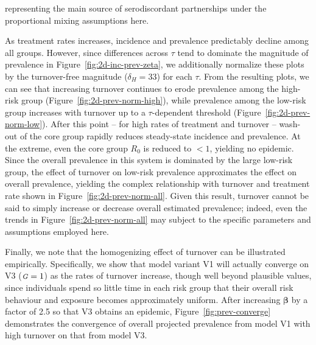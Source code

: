 \documentclass[10pt]{article}
\numberwithin{equation}{section}
\newcommand{\G}{{\mbox{\footnotesize{\textit{G}}}}}
\newcommand{\fig}[1]{Figure~\ref{#1}}
\begin{document}
representing the main source of serodiscordant partnerships
under the proportional mixing assumptions here.
\par
As treatment rates increases,
incidence and prevalence predictably decline among all groups.
However, since differences across $\tau$ tend to dominate
the magnitude of prevalence in \fig{fig:2d-inc-prev-zeta},
we additionally normalize these plots
by the turnover-free magnitude ($\delta_H = 33$) for each $\tau$.
From the resulting plots, we can see that
increasing turnover continues to erode prevalence among the high-risk group
(\fig{fig:2d-prev-norm-high}),
while prevalence among the low-risk group increases with turnover
up to a $\tau$-dependent threshold
(\fig{fig:2d-prev-norm-low}).
After this point -- for high rates of treatment and turnover --
wash-out of the core group rapidly reduces steady-state incidence and prevalence.
At the extreme, even the core group $R_0$ is reduced to $< 1$, yielding no epidemic.
Since the overall prevalence in this system
is dominated by the large low-risk group,
the effect of turnover on low-risk prevalence approximates
the effect on overall prevalence, yielding
the complex relationship with turnover and treatment rate
shown in \fig{fig:2d-prev-norm-all}.
Given this result,
turnover cannot be said to simply increase or decrease
overall estimated prevalence;
indeed, even the trends in \fig{fig:2d-prev-norm-all} may subject to the
specific parameters and assumptions employed here.
\par
Finally, we note that %
the homogenizing effect of turnover can be illustrated empirically.
Specifically, we show that model variant V1 will actually converge on V3 ($\G = 1$)
as the rates of turnover increase, though well beyond plausible values,
since individuals spend so little time in each risk group
that their overall risk behaviour and exposure becomes approximately uniform.
After increasing $\bm{\beta}$ by a factor of 2.5 so that V3 obtains an epidemic,
\fig{fig:prev-converge} demonstrates the convergence of overall projected prevalence
from model V1 with high turnover on that from model V3.
\end{document}
